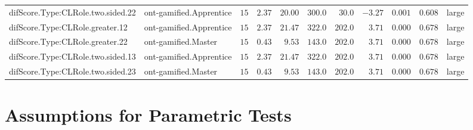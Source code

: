 \documentclass[6pt,a4paper]{article}
\begin{document}
\begin{landscape}
{\begin{longtable}{llrrrrrrrrl}
difScore.Type:CLRole.two.sided.22&ont-gamified.Apprentice&$15$&$2.37$&$20.00$&$300.0$&$ 30.0$&$-3.27$&$0.001$&$0.608$&large\tabularnewline
difScore.Type:CLRole.greater.12&ont-gamified.Apprentice&$15$&$2.37$&$21.47$&$322.0$&$202.0$&$ 3.71$&$0.000$&$0.678$&large\tabularnewline
difScore.Type:CLRole.greater.22&ont-gamified.Master&$15$&$0.43$&$ 9.53$&$143.0$&$202.0$&$ 3.71$&$0.000$&$0.678$&large\tabularnewline
difScore.Type:CLRole.two.sided.13&ont-gamified.Apprentice&$15$&$2.37$&$21.47$&$322.0$&$202.0$&$ 3.71$&$0.000$&$0.678$&large\tabularnewline
difScore.Type:CLRole.two.sided.23&ont-gamified.Master&$15$&$0.43$&$ 9.53$&$143.0$&$202.0$&$ 3.71$&$0.000$&$0.678$&large\tabularnewline
\hline
\end{longtable}}

\end{landscape}

\section{Assumptions for Parametric Tests}
\end{document}
